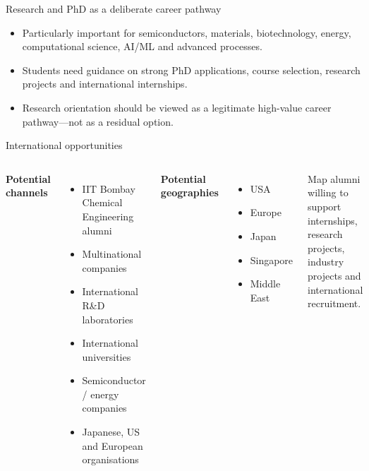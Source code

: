 \documentclass[aspectratio=169,11pt]{beamer}
\begin{document}
\begin{frame}{Research and PhD as a deliberate career pathway}
\centering
{}
\vspace{5mm}
\begin{itemize}
\item Particularly important for semiconductors, materials, biotechnology, energy, computational science, AI/ML and advanced processes.
\item Students need guidance on strong PhD applications, course selection, research projects and international internships.
\item Research orientation should be viewed as a legitimate high-value career pathway—not as a residual option.
\end{itemize}
\end{frame}

\begin{frame}{International opportunities}
\begin{columns}[T]
\textbf{Potential channels}
\begin{itemize}
\item IIT Bombay Chemical Engineering alumni
\item Multinational companies
\item International R\&D laboratories
\item International universities
\item Semiconductor / energy companies
\item Japanese, US and European organisations
\end{itemize}
\textbf{Potential geographies}
\begin{itemize}
\item USA
\item Europe
\item Japan
\item Singapore
\item Middle East
\end{itemize}
\vspace{2mm}
Map alumni willing to support internships, research projects, industry projects and international recruitment.
\end{columns}
\end{frame}
\end{document}
